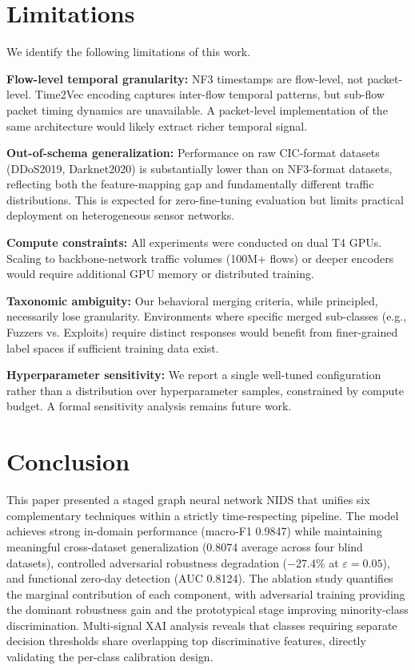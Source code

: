 \documentclass[compsoc,journal]{IEEEtran}
\begin{document}
\section{Limitations}

We identify the following limitations of this work.

\textbf{Flow-level temporal granularity:} NF3 timestamps are flow-level, not packet-level. Time2Vec encoding captures inter-flow temporal patterns, but sub-flow packet timing dynamics are unavailable. A packet-level implementation of the same architecture would likely extract richer temporal signal.

\textbf{Out-of-schema generalization:} Performance on raw CIC-format datasets (DDoS2019, Darknet2020) is substantially lower than on NF3-format datasets, reflecting both the feature-mapping gap and fundamentally different traffic distributions. This is expected for zero-fine-tuning evaluation but limits practical deployment on heterogeneous sensor networks.

\textbf{Compute constraints:} All experiments were conducted on dual T4 GPUs. Scaling to backbone-network traffic volumes (100M+ flows) or deeper encoders would require additional GPU memory or distributed training.

\textbf{Taxonomic ambiguity:} Our behavioral merging criteria, while principled, necessarily lose granularity. Environments where specific merged sub-classes (e.g., Fuzzers vs. Exploits) require distinct responses would benefit from finer-grained label spaces if sufficient training data exist.

\textbf{Hyperparameter sensitivity:} We report a single well-tuned configuration rather than a distribution over hyperparameter samples, constrained by compute budget. A formal sensitivity analysis remains future work.

\section{Conclusion}

This paper presented a staged graph neural network NIDS that unifies six complementary techniques within a strictly time-respecting pipeline. The model achieves strong in-domain performance (macro-F1 0.9847) while maintaining meaningful cross-dataset generalization (0.8074 average across four blind datasets), controlled adversarial robustness degradation ($-$27.4\% at $\varepsilon=0.05$), and functional zero-day detection (AUC 0.8124). The ablation study quantifies the marginal contribution of each component, with adversarial training providing the dominant robustness gain and the prototypical stage improving minority-class discrimination. Multi-signal XAI analysis reveals that classes requiring separate decision thresholds share overlapping top discriminative features, directly validating the per-class calibration design.
\end{document}
